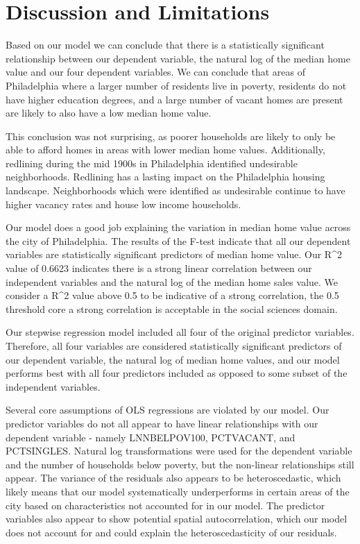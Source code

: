\documentclass[
]{article}
\begin{document}
\hypertarget{discussion-and-limitations}{%
\section{Discussion and Limitations}\label{discussion-and-limitations}}

Based on our model we can conclude that there is a statistically
significant relationship between our dependent variable, the natural log
of the median home value and our four dependent variables. We can
conclude that areas of Philadelphia where a larger number of residents
live in poverty, residents do not have higher education degrees, and a
large number of vacant homes are present are likely to also have a low
median home value.

This conclusion was not surprising, as poorer households are likely to
only be able to afford homes in areas with lower median home values.
Additionally, redlining during the mid 1900s in Philadelphia identified
undesirable neighborhoods. Redlining has a lasting impact on the
Philadelphia housing landscape. Neighborhoods which were identified as
undesirable continue to have higher vacancy rates and house low income
households.

Our model does a good job explaining the variation in median home value
across the city of Philadelphia. The results of the F-test indicate that
all our dependent variables are statistically significant predictors of
median home value. Our R\^{}2 value of 0.6623 indicates there is a
strong linear correlation between our independent variables and the
natural log of the median home sales value. We consider a R\^{}2 value
above 0.5 to be indicative of a strong correlation, the 0.5 threshold
core a strong correlation is acceptable in the social sciences domain.

Our stepwise regression model included all four of the original
predictor variables. Therefore, all four variables are considered
statistically significant predictors of our dependent variable, the
natural log of median home values, and our model performs best with all
four predictors included as opposed to some subset of the independent
variables.

Several core assumptions of OLS regressions are violated by our model.
Our predictor variables do not all appear to have linear relationships
with our dependent variable - namely LNNBELPOV100, PCTVACANT, and
PCTSINGLES. Natural log transformations were used for the dependent
variable and the number of households below poverty, but the non-linear
relationships still appear. The variance of the residuals also appears
to be heteroscedastic, which likely means that our model systematically
underperforms in certain areas of the city based on characteristics not
accounted for in our model. The predictor variables also appear to show
potential spatial autocorrelation, which our model does not account for
and could explain the heteroscedasticity of our residuals.
\end{document}
